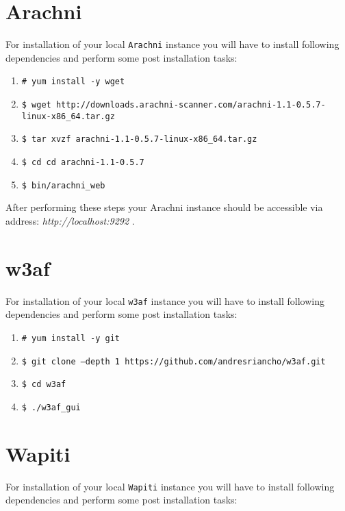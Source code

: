 	\section{Arachni}\label{app:installation-of-arachni}
	
	For installation of your local \texttt{Arachni} instance you will have to install following dependencies and perform some post installation tasks:
	
			\begin{enumerate}
				\item \texttt{\# yum install -y wget}
				\item \texttt{\$ wget http://downloads.arachni-scanner.com/arachni-1.1-0.5.7-linux-x86\_64.tar.gz}
				\item \texttt{\$ tar xvzf arachni-1.1-0.5.7-linux-x86\_64.tar.gz}				
				\item \texttt{\$ cd cd arachni-1.1-0.5.7}	
				\item \texttt{\$ bin/arachni\_web }	
			\end{enumerate}
			
	After performing these steps your Arachni instance should be accessible via address: \textit{http://localhost:9292} .
	
	\section{w3af}\label{app:installation-of-w3af}
	
	For installation of your local \texttt{w3af} instance you will have to install following dependencies and perform some post installation tasks:
	
			\begin{enumerate}
				\item \texttt{\# yum install -y  git}
				\item \texttt{\$ git clone --depth 1 https://github.com/andresriancho/w3af.git}
				\item \texttt{\$ cd w3af}				
				\item \texttt{\$ ./w3af\_gui}	
			\end{enumerate}
	
	\section{Wapiti}\label{app:installation-of-wapiti}
	
	For installation of your local \texttt{Wapiti} instance you will have to install following dependencies and perform some post installation tasks:
	
